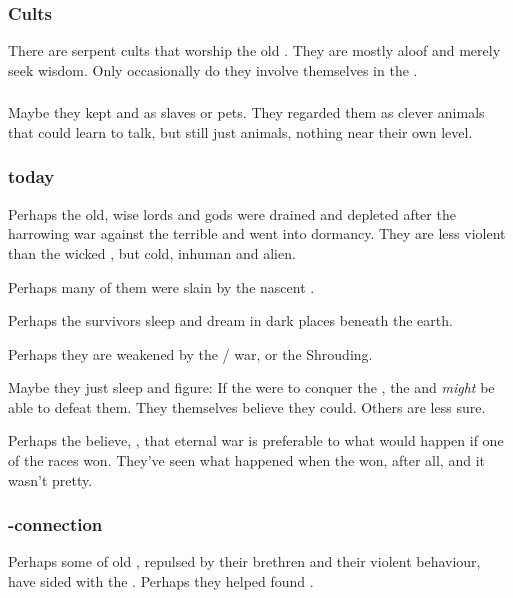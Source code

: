 \subsubsection{Cults}
There are serpent cults that worship the old \ophidians. 
They are mostly aloof and merely seek wisdom. 
Only occasionally do they involve themselves in the \feud. 





\subsubsection{\Nephilim}
Maybe they kept \nephilim{} and \meccara{} as slaves or pets. 
They regarded them as clever animals that could learn to talk, but still just animals, nothing near their own level. 





\subsubsection{\Ophidians today}
Perhaps the old, wise \ophidian{} lords and gods were drained and depleted after the harrowing war against the terrible \xzaishanns{} and went into dormancy. 
They are less violent than the wicked \draecchonosh, but cold, inhuman and alien. 

Perhaps many of them were slain by the nascent \draecchonosh. 

Perhaps the survivors sleep and dream in dark places beneath the earth. 

Perhaps they are weakened by the \dragon/\bane{} war, or the Shrouding. 

Maybe they just sleep and figure: 
If the \banes{} were to conquer the \dragons, the \ophidians{} and \nagae{} \emph{might} be able to defeat them. 
They themselves believe they could. 
Others are less sure. 

Perhaps the \ophidians{} believe, , that eternal war is preferable to what would happen if one of the races won. 
They've seen what happened when the \draecchonosh{} won, after all, and it wasn't pretty.





\subsubsection{\Ophidian-\resphan connection}
Perhaps some of old \ophidians, repulsed by their \draconic{} brethren and their violent behaviour, have sided with the \resphain. Perhaps they helped found \Mystraacht. 

